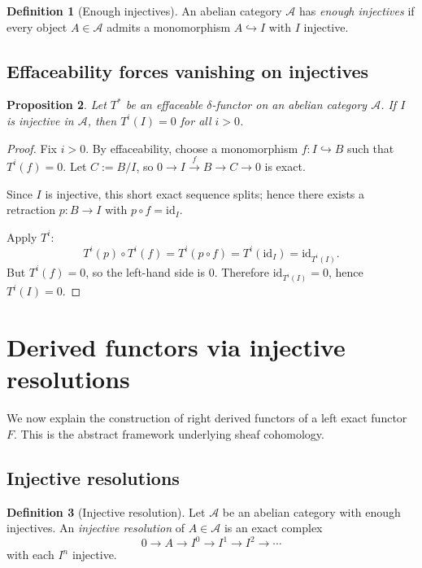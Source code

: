 \documentclass[11pt]{article}
\theoremstyle{definition}
\newtheorem{definition}{Definition}[section]
\theoremstyle{plain}
\newtheorem{proposition}[definition]{Proposition}
\begin{document}
\begin{definition}[Enough injectives]\label{def:enough-injectives}
An abelian category $\mathcal{A}$ has \emph{enough injectives} if every object $A\in\mathcal{A}$ admits a monomorphism $A\hookrightarrow I$ with $I$ injective.
\end{definition}

\subsection{Effaceability forces vanishing on injectives}

\begin{proposition}\label{prop:effaceable-vanish-inj}
Let $T^\ast$ be an effaceable $\delta$-functor on an abelian category $\mathcal{A}$.
If $I$ is injective in $\mathcal{A}$, then $T^i(I)=0$ for all $i>0$.
\end{proposition}

\begin{proof}
Fix $i>0$. By effaceability, choose a monomorphism $f:I\hookrightarrow B$ such that $T^i(f)=0$.
Let $C:=B/I$, so $0\to I\xrightarrow{f} B\to C\to 0$ is exact.

Since $I$ is injective, this short exact sequence splits; hence there exists a retraction
$p:B\to I$ with $p\circ f=\mathrm{id}_I$.

Apply $T^i$:
\[
T^i(p)\circ T^i(f)=T^i(p\circ f)=T^i(\mathrm{id}_I)=\mathrm{id}_{T^i(I)}.
\]
But $T^i(f)=0$, so the left-hand side is $0$. Therefore $\mathrm{id}_{T^i(I)}=0$, hence $T^i(I)=0$.
\end{proof}

\section{Derived functors via injective resolutions}

We now explain the construction of right derived functors of a left exact functor $F$.
This is the abstract framework underlying sheaf cohomology.

\subsection{Injective resolutions}

\begin{definition}[Injective resolution]\label{def:inj-resolution}
Let $\mathcal{A}$ be an abelian category with enough injectives. An \emph{injective resolution} of $A\in\mathcal{A}$ is an exact complex
\[
0\longrightarrow A\longrightarrow I^0\longrightarrow I^1\longrightarrow I^2\longrightarrow \cdots
\]
with each $I^n$ injective.
\end{definition}
\end{document}
